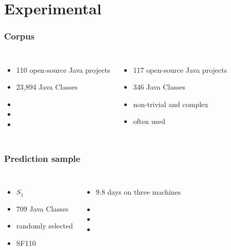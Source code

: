 \section{Experimental} 

\begin{frame}
	\frametitle{Corpus}
	
	\begin{columns}[c]
		
		\begin{itemize}
			\item 110 open-source Java projects
			\item 23,894 Java Classes
			\item 
			\item
			\item
		\end{itemize}
		
		\begin{itemize}
			\item 117 open-source Java projects
			\item 346 Java Classes
			\item non-trivial and complex
			\item often used
		\end{itemize}

	\end{columns}
	
\end{frame}

\begin{frame}
	\frametitle{Prediction sample}
	
	\begin{columns}[c]
		
		\column{.45\textwidth}
		\blockheading{}
		\begin{itemize}
			\item $S_1$
			\item 709 Java Classes
			\item randomly selected
			\item SF110
		\end{itemize}
		
		\column{.45\textwidth}
		\blockheading{}
		\begin{itemize}
			\item 9.8 days on three machines
			\item 
			\item 
			\item 
		\end{itemize}

	\end{columns}
	
\end{frame}

